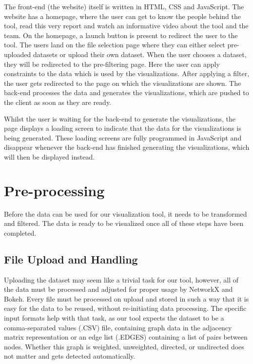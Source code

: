 \documentclass[journal]{vgtc}                %
\begin{document}
The front-end (the website) itself is written in HTML, CSS and JavaScript. The website has a homepage, where the user can get to know the people behind the tool, read this very report and watch an informative video about the tool and the team. On the homepage, a launch button is present to redirect the user to the tool. The users land on the file selection page where they can either select pre-uploaded datasets or upload their own dataset. When the user chooses a dataset, they will be redirected to the pre-filtering page. Here the user can apply constraints to the data which is used by the visualizations. After applying a filter, the user gets redirected to the page on which the visualizations are shown. The back-end processes the data and generates the visualizations, which are pushed to the client as soon as they are ready.

Whilst the user is waiting for the back-end to generate the visualizations, the page displays a loading screen to indicate that the data for the visualizations is being generated. These loading screens are fully programmed in JavaScript and disappear whenever the back-end has finished generating the visualizations, which will then be displayed instead.

\section{Pre-processing} %
Before the data can be used for our visualization tool, it needs to be transformed and filtered. The data is ready to be visualized once all of these steps have been completed.

\subsection{File Upload and Handling} %
Uploading the dataset may seem like a trivial task for our tool, however, all of the data must be processed and adjusted for proper usage by NetworkX and Bokeh. Every file must be processed on upload and stored in such a way that it is easy for the data to be reused, without re-initiating data processing. The specific input formats help with that task, as our tool expects the dataset to be a comma-separated values (.CSV) file, containing graph data in the adjacency matrix representation or an edge list (.EDGES) containing a list of pairs between nodes. Whether this graph is weighted, unweighted, directed, or undirected does not matter and gets detected automatically.
\end{document}
